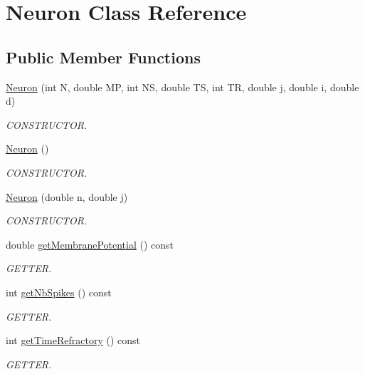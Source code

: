 \hypertarget{classNeuron}{\section{Neuron Class Reference}
\label{classNeuron}
}
\subsection*{Public Member Functions}
\begin{DoxyCompactItemize}
\item 
\hyperlink{classNeuron_a8a7e6331f728054b09a0be46c13ebe5e}{Neuron} (int N, double M\-P, int N\-S, double T\-S, int T\-R, double j, double i, double d)
\begin{DoxyCompactList}\small\item\em C\-O\-N\-S\-T\-R\-U\-C\-T\-O\-R. \end{DoxyCompactList}\item 
\hyperlink{classNeuron_a823487d01615fadb8ac19a2768dd9d96}{Neuron} ()
\begin{DoxyCompactList}\small\item\em C\-O\-N\-S\-T\-R\-U\-C\-T\-O\-R. \end{DoxyCompactList}\item 
\hyperlink{classNeuron_a52e291efb1939ecf7e7536f7484f9103}{Neuron} (double n, double j)
\begin{DoxyCompactList}\small\item\em C\-O\-N\-S\-T\-R\-U\-C\-T\-O\-R. \end{DoxyCompactList}\item 
double \hyperlink{classNeuron_a86341dee7a81765fe4840777a008c688}{get\-Membrane\-Potential} () const 
\begin{DoxyCompactList}\small\item\em G\-E\-T\-T\-E\-R. \end{DoxyCompactList}\item 
int \hyperlink{classNeuron_ab1efa405eb0cd7bac6ca012c961efe5d}{get\-Nb\-Spikes} () const 
\begin{DoxyCompactList}\small\item\em G\-E\-T\-T\-E\-R. \end{DoxyCompactList}\item 
int \hyperlink{classNeuron_a1bb38a108b9f0e2a8ae553c9d036c01c}{get\-Time\-Refractory} () const 
\begin{DoxyCompactList}\small\item\em G\-E\-T\-T\-E\-R. \end{DoxyCompactList}\item 

\end{DoxyCompactItemize}

